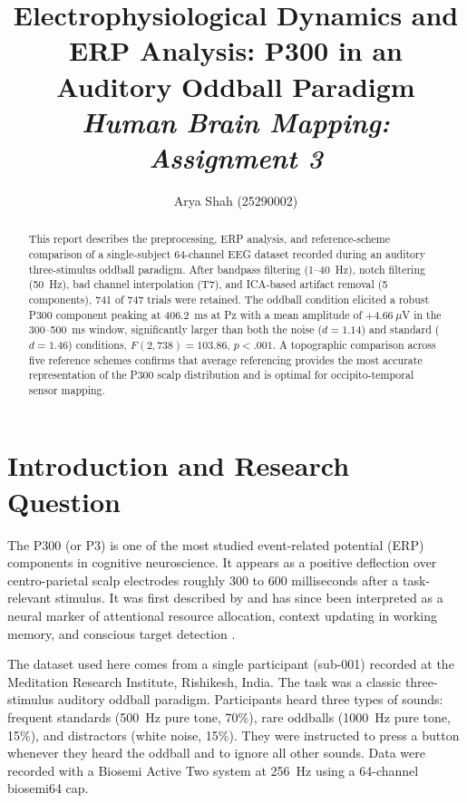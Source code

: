 \documentclass[11pt, a4paper, twocolumn]{article}
\title{\textbf{Electrophysiological Dynamics and ERP Analysis: P300 in an Auditory Oddball Paradigm}\\[0.3em]
{\small \textit{Human Brain Mapping: Assignment 3 }}}
\author{Arya Shah (25290002)}
\date{}
\begin{document}
  \maketitle
  \begin{abstract}
    \noindent This report describes the preprocessing, ERP analysis, and reference-scheme comparison of a single-subject 64-channel EEG dataset recorded during an auditory three-stimulus oddball paradigm. After bandpass filtering (1--40~Hz), notch filtering (50~Hz), bad channel interpolation (T7), and ICA-based artifact removal (5 components), 741 of 747 trials were retained. The oddball condition elicited a robust P300 component peaking at 406.2~ms at Pz with a mean amplitude of $+4.66\ \mu$V in the 300--500~ms window, significantly larger than both the noise ($d = 1.14$) and standard ($d = 1.46$) conditions, $F(2, 738) = 103.86$, $p < .001$. A topographic comparison across five reference schemes confirms that average referencing provides the most accurate representation of the P300 scalp distribution and is optimal for occipito-temporal sensor mapping.
    \vspace{0.5em}
  \end{abstract}
  \vspace{-0.5em}
  \vspace{0.5em}

\section{Introduction and Research Question}

The P300 (or P3) is one of the most studied event-related potential (ERP)
components in cognitive neuroscience. It appears as a positive deflection
over centro-parietal scalp electrodes roughly 300 to 600 milliseconds
after a task-relevant stimulus. It was first described by \citet{Sutton1965}
and has since been interpreted as a neural marker of attentional resource
allocation, context updating in working memory, and conscious target
detection \citep{Donchin1988, Polich2007}.

The dataset used here comes from a single participant (sub-001) recorded at
the Meditation Research Institute, Rishikesh, India. The task was a
classic three-stimulus auditory oddball paradigm. Participants heard three
types of sounds: frequent standards (500~Hz pure tone, 70\%), rare oddballs
(1000~Hz pure tone, 15\%), and distractors (white noise, 15\%). They were
instructed to press a button whenever they heard the oddball and to ignore
all other sounds. Data were recorded with a Biosemi Active Two system at
256~Hz using a 64-channel biosemi64 cap.
\end{document}
